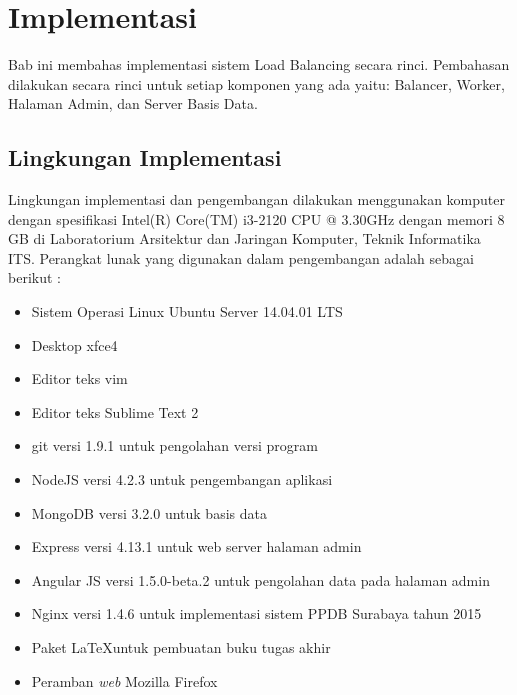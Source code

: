 \documentclass{ta-its}
\begin{document}
		         
		         
	\chapter{Implementasi}
        Bab ini membahas implementasi sistem Load Balancing secara rinci. Pembahasan dilakukan secara rinci untuk setiap komponen yang ada yaitu: Balancer, Worker, Halaman Admin, dan Server Basis Data.
        
        \section{Lingkungan Implementasi}
	        Lingkungan implementasi dan pengembangan dilakukan menggunakan komputer dengan spesifikasi Intel(R) Core(TM) i3-2120 CPU @ 3.30GHz dengan memori 8 GB di Laboratorium Arsitektur dan Jaringan Komputer, Teknik Informatika ITS. Perangkat lunak yang digunakan dalam pengembangan adalah sebagai berikut :
	        \begin{itemize}
	        	\item Sistem Operasi Linux Ubuntu Server 14.04.01 LTS
	        	\item Desktop xfce4
	        	\item Editor teks vim
	        	\item Editor teks Sublime Text 2
	        	\item git versi 1.9.1 untuk pengolahan versi program
	        	\item NodeJS versi 4.2.3 untuk pengembangan aplikasi
	        	\item MongoDB versi 3.2.0 untuk basis data
	        	\item Express versi 4.13.1 untuk web server halaman admin
	        	\item Angular JS versi 1.5.0-beta.2 untuk pengolahan data pada halaman admin
	        	\item Nginx versi 1.4.6 untuk implementasi sistem PPDB Surabaya tahun 2015
	        	\item Paket \LaTeX untuk pembuatan buku tugas akhir
	        	\item Peramban \textit{web} Mozilla Firefox
	        \end{itemize}
	        
\end{document}
